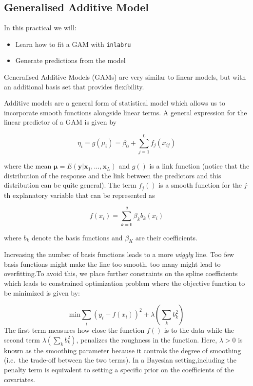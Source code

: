 \documentclass[
  letterpaper,
  DIV=11,
  numbers=noendperiod]{scrartcl}
\providecommand{\tightlist}{%
  \setlength{\itemsep}{0pt}\setlength{\parskip}{0pt}}\usepackage{longtable,booktabs,array}
\begin{document}
\subsection{Generalised Additive Model}\label{sec-gam_ex}

In this practical we will:

\begin{itemize}
\tightlist
\item
  Learn how to fit a GAM with \texttt{inlabru}
\item
  Generate predictions from the model
\end{itemize}

Generalised Additive Models (GAMs) are very similar to linear models,
but with an additional basis set that provides flexibility.

Additive models are a general form of statistical model which allows us
to incorporate smooth functions alongside linear terms. A general
expression for the linear predictor of a GAM is given by

\[
\eta_i = g(\mu_i) = \beta_0 + \sum_{j=1}^L f_j(x_{ij}) 
\]

where the mean
\(\pmb{\mu} = E(\mathbf{y}|\mathbf{x}_1,\ldots,\mathbf{x}_L)\) and
\(g()\) is a link function (notice that the distribution of the response
and the link between the predictors and this distribution can be quite
general). The term \(f_j()\) is a smooth function for the \emph{j}-th
explanatory variable that can be represented as

\[
f(x_i) = \sum_{k=0}^q\beta_k b_k(x_i)
\]

where \(b_k\) denote the basis functions and \(\beta_K\) are their
coefficients.

Increasing the number of basis functions leads to a more \emph{wiggly}
line. Too few basis functions might make the line too smooth, too many
might lead to overfitting.To avoid this, we place further constraints on
the spline coefficients which leads to constrained optimization problem
where the objective function to be minimized is given by:

\[
\mathrm{min}\sum_i(y_i-f(x_i))^2 + \lambda(\sum_kb^2_k)
\] The first term measures how close the function \(f()\) is to the data
while the second term \(\lambda(\sum_kb^2_k)\), penalizes the roughness
in the function. Here, \(\lambda >0\) is known as the smoothing
parameter because it controls the degree of smoothing (i.e.~the
trade-off between the two terms). In a Bayesian setting,including the
penalty term is equivalent to setting a specific prior on the
coefficients of the covariates.
\end{document}
